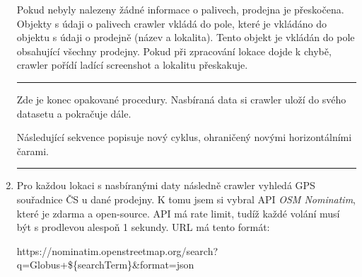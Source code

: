 \begin{enumerate}
        Pokud nebyly nalezeny žádné informace o palivech, prodejna
        je přeskočena. Objekty s údaji o palivech crawler vkládá do pole,
        které je vkládáno do objektu s údaji o prodejně (název a lokalita).
        Tento objekt je vkládán do pole obsahující všechny prodejny. Pokud
        při zpracování lokace dojde k chybě, crawler pořídí ladící screenshot
        a lokalitu přeskakuje.
        \hrule
        Zde je konec opakované procedury. Nasbíraná data si crawler uloží
        do svého datasetu a pokračuje dále.
        
        Následující sekvence popisuje nový cyklus, ohraničený novými
        horizontálními čarami.
        \hrule
    \item Pro každou lokaci s nasbíranými daty následně crawler vyhledá GPS
        souřadnice ČS u dané prodejny. K tomu jsem si vybral API \emph{OSM
        Nominatim}, které je zdarma a open-source. API má rate limit, tudíž
        každé volání musí být s prodlevou alespoň 1 sekundy. URL má tento
        formát:
        
        \begin{tt}
            \centering
            https://nominatim.openstreetmap.org/search?q=Globus+\$\{searchTerm\}\&format=json
        \end{tt}
        

\end{enumerate}
